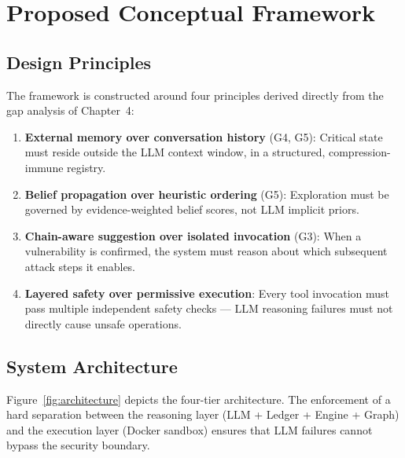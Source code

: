 \documentclass[12pt,a4paper,oneside,openany]{book}
\begin{document}
\chapter{Proposed Conceptual Framework}
\label{ch:framework}

\section{Design Principles}

The framework is constructed around four principles derived directly from the gap analysis of Chapter~4:

\begin{enumerate}
\item \textbf{External memory over conversation history} (G4, G5): Critical state must reside outside the LLM context window, in a structured, compression-immune registry.
\item \textbf{Belief propagation over heuristic ordering} (G5): Exploration must be governed by evidence-weighted belief scores, not LLM implicit priors.
\item \textbf{Chain-aware suggestion over isolated invocation} (G3): When a vulnerability is confirmed, the system must reason about which subsequent attack steps it enables.
\item \textbf{Layered safety over permissive execution}: Every tool invocation must pass multiple independent safety checks — LLM reasoning failures must not directly cause unsafe operations.
\end{enumerate}

\section{System Architecture}

Figure~\ref{fig:architecture} depicts the four-tier architecture. The enforcement of a hard separation between the reasoning layer (LLM + Ledger + Engine + Graph) and the execution layer (Docker sandbox) ensures that LLM failures cannot bypass the security boundary.
\end{document}
